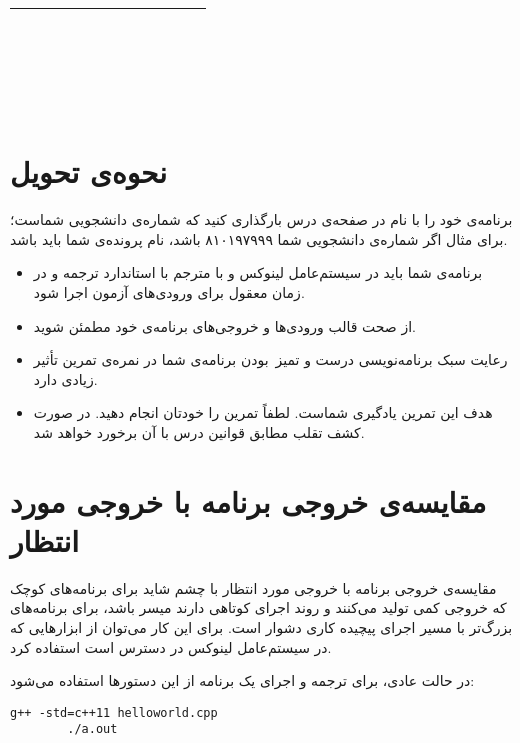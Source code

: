 \documentclass{utap}
\begin{document}
\begin{table}[H]
\begin{tabular}{|c|c|}
\begin{latin}
\begin{minipage}[]{0.3\textwidth}
\begin{verbatim}
					
					
					
					
					\end{verbatim}
			\end{minipage}\end{latin}
			\\
			\hline
		\end{tabular}
	\end{table}
	
	\section{نحوه‌ی تحویل}
	
	برنامه‌ی خود را با نام  در صفحه‌ی  درس بارگذاری کنید که  شماره‌ی دانشجویی شماست؛ برای مثال اگر شماره‌ی دانشجویی شما ۸۱۰۱۹۷۹۹۹ باشد، نام پرونده‌ی شما باید  باشد.
	
	\begin{itemize}
		\item برنامه‌ی شما باید در سیستم‌عامل لینوکس و با مترجم  با استاندارد  ترجمه و در زمان معقول برای ورودی‌های آزمون اجرا شود.
		\item از صحت قالب ورودی‌ها و خروجی‌های برنامه‌ی خود مطمئن شوید.
		\item رعایت سبک برنامه‌نویسی درست و تمیز~بودن برنامه‌ی شما در نمره‌ی تمرین تأثیر زیادی دارد.
		\item هدف این تمرین یادگیری شماست. لطفاً تمرین را خودتان انجام دهید. در صورت کشف تقلب مطابق قوانین درس با آن برخورد خواهد شد.
	\end{itemize}
	
	\appendix
	
	\section{مقایسه‌ی خروجی برنامه با خروجی مورد انتظار\label{sec:diff}}
	
	مقایسه‌ی خروجی برنامه با خروجی مورد انتظار با چشم شاید برای برنامه‌های کوچک که خروجی کمی تولید می‌کنند و روند اجرای کوتاهی دارند میسر باشد، برای برنامه‌های بزرگ‌تر با مسیر اجرای پیچیده کاری دشوار است. برای این کار می‌توان از ابزارهایی که در سیستم‌عامل لینوکس در دسترس است استفاده کرد.
	
	در حالت عادی، برای ترجمه و اجرای یک برنامه از این دستورها استفاده می‌شود:
	\begin{latin}%
		\begin{Verbatim}[fontsize=\small]
		g++ -std=c++11 helloworld.cpp
		./a.out
		\end{Verbatim}
	\end{latin}
	
\end{document}
